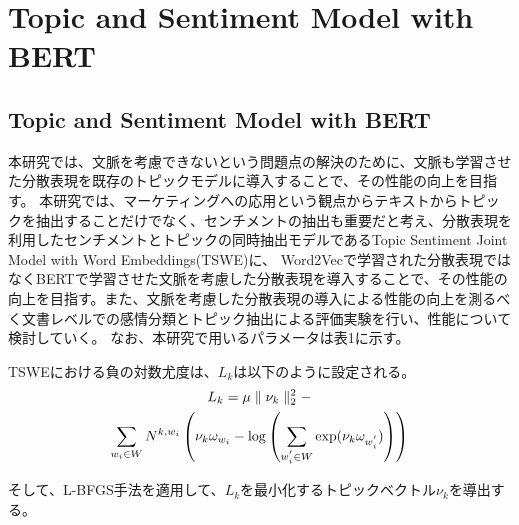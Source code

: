 \documentclass[uplatex]{jsarticle}
\begin{document}
\section{Topic and Sentiment Model with BERT}
\subsection{Topic and Sentiment Model with BERT}
本研究では、文脈を考慮できないという問題点の解決のために、文脈も学習させた分散表現を既存のトピックモデルに導入することで、その性能の向上を目指す。
本研究では、マーケティングへの応用という観点からテキストからトピックを抽出することだけでなく、センチメントの抽出も重要だと考え、分散表現を利用したセンチメントとトピックの同時抽出モデルであるTopic Sentiment Joint Model with Word Embeddings(TSWE)\cite{TSWE}に、
Word2Vecで学習された分散表現ではなくBERTで学習させた文脈を考慮した分散表現を導入することで、その性能の向上を目指す。また、文脈を考慮した分散表現の導入による性能の向上を測るべく文書レベルでの感情分類とトピック抽出による評価実験を行い、性能について検討していく。
なお、本研究で用いるパラメータは表1に示す。

TSWEにおける負の対数尤度は、$L_{k}$は以下のように設定される。
\begin{multline}
    L_{k} = \mu \parallel \nu_{k} \parallel_{2}^{2} - \\
    \displaystyle \sum_{w_{i}\in{W}} N^{k,w_{i}}\left(\nu_{k}\omega_{w_{i}} - {\rm log} \left(\displaystyle \sum_{w_{i}^{'}\in{W}} {\rm exp}(\nu_{k}\omega_{w_{i}^{'}})\right)\right)
\end{multline}

そして、L-BFGS\cite{L-BFGS}手法を適用して、$L_k$を最小化するトピックベクトル$\nu_{k}$を導出する。
\end{document}
